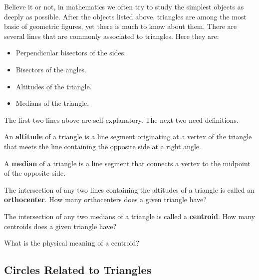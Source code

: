 Believe it or not, in mathematics we often try to study the simplest
objects as deeply as possible. After the objects listed above,
triangles are among the most basic of geometric figures, yet there is
much to know about them.  There are several lines that are commonly
associated to triangles. Here they are:
\begin{itemize}
\item Perpendicular bisectors of the sides.
\item Bisectors of the angles.
\item Altitudes of the triangle.
\item Medians of the triangle. 
\end{itemize}

The first two lines above are self-explanatory. The next two need definitions.

\begin{definition} 
An \textbf{altitude} of a triangle is a line segment originating at a
vertex of the triangle that meets the line containing the opposite
side at a right angle.
\end{definition}


\begin{definition} 
A \textbf{median} of a triangle is a line segment that connects a
vertex to the midpoint of the opposite side.
\end{definition}

\begin{question} 
The intersection of any two lines containing the altitudes of a
triangle is called an \textbf{orthocenter}. How
many orthocenters does a given triangle have?
\end{question}
\QM


\begin{question} 
The intersection of any two medians of a triangle is called a
\textbf{centroid}. How many centroids does a given
triangle have?
\end{question}
\QM


\begin{question} What is the physical meaning of a centroid?
\end{question}
\QM




\subsection{Circles Related to Triangles}


